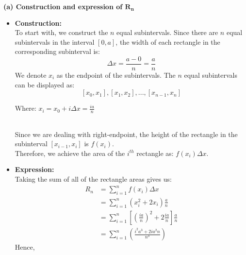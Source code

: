 \textbf{(a) Construction and expression of $\mathbf{R_n}$}
    \begin{itemize}
    \item \textbf{Construction:} \\
    To start with, we construct the $n$ equal subintervals. Since there are $n$ equal subintervals in the interval $[0, a]$, the width of each rectangle in the corresponding subinterval is: 
    \begin{equation*}
        \Delta x = \frac{a - 0}{n} = \frac{a}{n}
    \end{equation*}
    We denote $x_i$ as the endpoint of the subintervals. The $n$ equal subintervals can be displayed as: 
    \[[x_0, x_1], [x_1, x_2],...,[x_{n-1}, x_n]\]
    \centerline {Where: \(x_i = x_0 + i\Delta x = \frac{ia}{n}\)} \\
    Since we are dealing with right-endpoint, the height of the rectangle in the subinterval $[x_{i-1}, x_i]$ is $f(x_i)$. \\
    Therefore, we achieve the area of the $i^{th}$ rectangle as: \(f(x_i)\Delta x\). 
    \item \textbf{Expression:} \\
    Taking the sum of all of the rectangle areas gives us: 
    \begin{equation*}
    \begin{split}
        R_n &= \sum_{i=1}^n f(x_i)\Delta x \\
        &= \sum_{i=1}^n (x_i^2 + 2x_i)\frac{a}{n} \\
        &= \sum_{i=1}^n \left[\left(\frac{ia}{n}\right)^2 + 2\frac{ia}{n}\right]\frac{a}{n} \\
        &= \sum_{i=1}^n \left(\frac{i^{2}a^{3} + 2ia^{2}n}{n^3}\right)
    \end{split}
    \end{equation*}
    Hence,
    \begin{center}  \end{center}
    \end{itemize}

